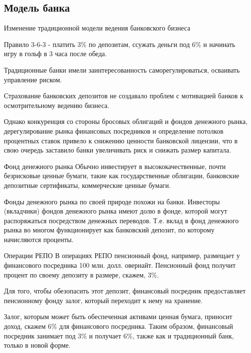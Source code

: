 \documentclass[_Banking_p1.tex]{subfiles}
\begin{document}
\subsection{Модель банка}
\begin{frame} [ allowframebreaks]{\setfontsize{12pt}Изменение традиционной модели ведения банковского бизнеса}
\begin{block}{Правило 3-6-3}
\quad
- платить 3\% по депозитам, ссужать деньги под 6\% и начинать игру в гольф в 3 часа после обеда.
\end{block}
\pagebreak
Традиционные банки имели заинтересованность саморегулироваться, осваивать управление риском. 

Страхование банковских депозитов не создавало проблем с мотивацией банков к осмотрительному ведению бизнеса. 

\pagebreak
Однако конкуренция со стороны бросовых облигаций и фондов денежного рынка, дерегулирование рынка финансовых посредников и определение потолков процентных ставок привело к снижению ценности банковской лицензии, что в свою очередь заставило банки увеличивать риск и снижать размер капитала.

\end{frame}

\begin{frame}{Фонд денежного рынка}
Обычно инвестирует в высококачественные, почти безрисковые ценные бумаги, такие как государственные облигации, банковские депозитные сертификаты, коммерческие ценные бумаги. 

Фонды денежного рынка по своей природе похожи на банки. Инвесторы (вкладчики) фондов денежного рынка имеют долю в фонде, которой могут распоряжаться посредством денежных переводов. Т.е. вклад в фонд денежного рынка во многом функционирует как банковский депозит, по которому начисляются проценты.
\end{frame}

\begin{frame}[ allowframebreaks ]{Операции РЕПО}
В операциях РЕПО пенсионный фонд, например, размещает у финансового посредника 100 млн. долл. овернайт. Пенсионный фонд получит процент по своему депозиту в размере, скажем, 3\%. 

Для того, чтобы обезопасить этот депозит, финансовый посредник предоставляет пенсионному фонду залог, который переходит к нему на хранение. 

\pagebreak
Залог, которым может быть обеспеченная активами ценная бумага, приносит доход, скажем 6\% для финансового посредника. Таким образом, финансовый посредник занимает под 3\% и получает 6\%, также как и традиционный банк, только в новой форме.
\end{frame}
\end{document}

